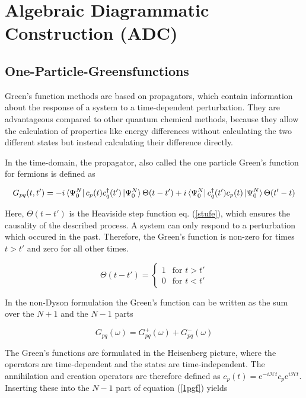\chapter{Algebraic Diagrammatic Construction (ADC)}
\section{One-Particle-Greensfunctions}\label{greensfkt}

Green's function methods are based on propagators, which contain information
about the response of a system to a time-dependent perturbation.\cite{McWeeny89}
They are advantageous compared to other quantum chemical methods, because they
allow the calculation of properties like energy differences without calculating
the two different states but instead calculating their difference directly.

In the time-domain, the propagator, also called the one particle Green's function
for fermions is defined as

\begin{equation}\label{1pgf}
G_{pq}(t,t') = -i \bra{\Psi_0^N}c_p(t)c_q^\dagger(t')\ket{\Psi_0^N}\Theta(t-t') +i \bra{\Psi_0^N}c_q^\dagger(t')c_p(t)\ket{\Psi_0^N}\Theta(t'-t)
\end{equation}

Here, $\Theta(t-t')$ is the Heaviside step function eq. (\ref{stufe}),
which ensures the causality of the described process. A system can only
respond to a perturbation which occured in the past. Therefore, the Green's
function is non-zero for times $t>t'$ and zero for all other times. \cite{nolting7}

\begin{equation}\label{stufe}
\Theta(t-t') = \begin{cases}
1 & \text{for } t>t'\\
0 & \text{for } t<t'
\end{cases}
\end{equation}

In the non-Dyson formulation \cite{Schirmer89} the Green's function can be
written as the sum over the $N+1$ and the $N-1$ parts

\begin{equation}
G_{pq}(\omega) = G_{pq}^+(\omega) + G_{pq}^-(\omega)
\end{equation}

The Green's functions are formulated in the Heisenberg picture, where the
operators are time-dependent and the states are time-independent.
The annihilation and creation operators are therefore defined as
$c_p(t) = \mathrm{e}^{-i\mathcal{H} t} c_p \mathrm{e}^{i\mathcal{H} t}$.
Inserting these into the $N-1$ part of equation (\ref{1pgf}) yields


